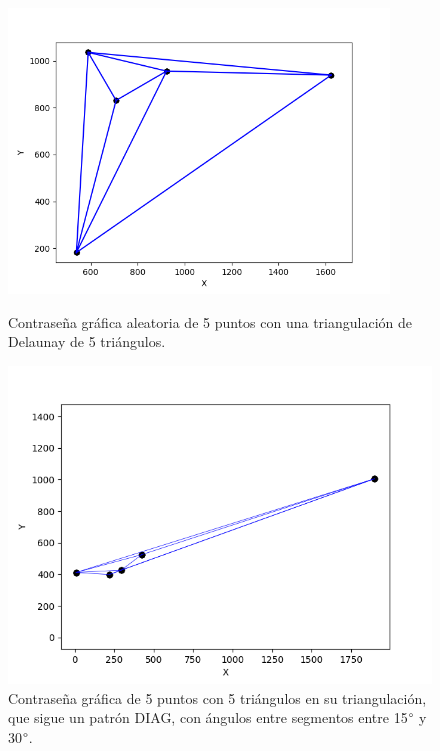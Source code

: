 \documentclass[12pt]{report}
\begin{document}
	\begin{figure}[h]
	\centering
	\begin{minipage}[t]{0.45\textwidth}
		\centering
		\includegraphics[width=0.9\textwidth]{alea5td.png}
		\caption{Contraseña gráfica aleatoria de 5 puntos con una triangulación de Delaunay de 5 triángulos.}
		\label{5TD}
		
	\end{minipage}\hfill
	\begin{minipage}[t]{0.45\textwidth}
		\centering
		\includegraphics[width=0.9\linewidth]{5td30.png}  %
		\caption{Contraseña gráfica de 5 puntos con 5 triángulos en su triangulación, que sigue un patrón DIAG, con ángulos entre segmentos entre 15$\degree$ y 30$\degree$.}
		\label{5td30}
	\end{minipage}
\end{figure}
\end{document}
